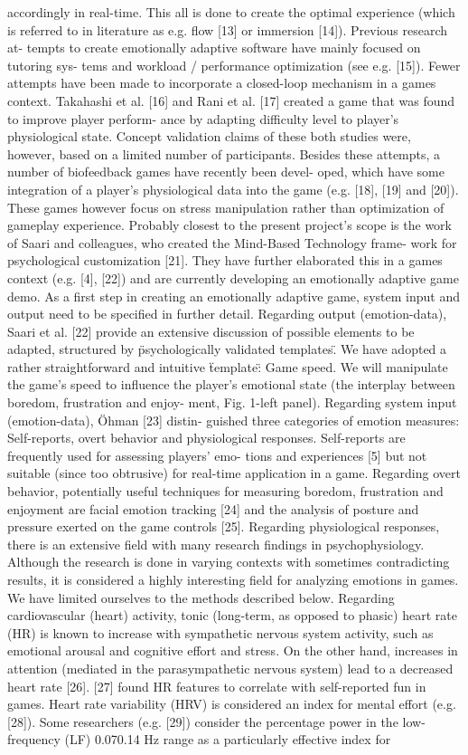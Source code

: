 accordingly in real-time. This all is done to create the optimal experience (which is referred to in literature as e.g. flow [13] or immersion [14]). Previous research at- tempts to create emotionally adaptive software have mainly focused on tutoring sys- tems and workload / performance optimization (see e.g. [15]). Fewer attempts have been made to incorporate a closed-loop mechanism in a games context. Takahashi et al. [16] and Rani et al. [17] created a game that was found to improve player perform- ance by adapting difficulty level to player's physiological state. Concept validation claims of these both studies were, however, based on a limited number of participants. Besides these attempts, a number of biofeedback games have recently been devel- oped, which have some integration of a player's physiological data into the game (e.g. [18], [19] and [20]). These games however focus on stress manipulation rather than optimization of gameplay experience. Probably closest to the present project's scope is the work of Saari and colleagues, who created the Mind-Based Technology frame- work for psychological customization [21]. They have further elaborated this in a games context (e.g. [4], [22]) and are currently developing an emotionally adaptive game demo. As a first step in creating an emotionally adaptive game, system input and output need to be specified in further detail. Regarding output (emotion-data), Saari et al. [22] provide an extensive discussion of possible elements to be adapted, structured by \"psychologically validated templates\". We have adopted a rather straightforward and intuitive \"template\": Game speed. We will manipulate the game's speed to influence the player's emotional state (the interplay between boredom, frustration and enjoy- ment, Fig. 1-left panel). Regarding system input (emotion-data), Öhman [23] distin- guished three categories of emotion measures: Self-reports, overt behavior and physiological responses. Self-reports are frequently used for assessing players' emo- tions and experiences [5] but not suitable (since too obtrusive) for real-time application in a game. Regarding overt behavior, potentially useful techniques for measuring boredom, frustration and enjoyment are facial emotion tracking [24] and the analysis of posture and pressure exerted on the game controls [25]. Regarding physiological responses, there is an extensive field with many research findings in psychophysiology. Although the research is done in varying contexts with sometimes contradicting results, it is considered a highly interesting field for analyzing emotions in games. We have limited ourselves to the methods described below. Regarding cardiovascular (heart) activity, tonic (long-term, as opposed to phasic) heart rate (HR) is known to increase with sympathetic nervous system activity, such as emotional arousal and cognitive effort and stress. On the other hand, increases in attention (mediated in the parasympathetic nervous system) lead to a decreased heart rate [26]. [27] found HR features to correlate with self-reported fun in games. Heart rate variability (HRV) is considered an index for mental effort (e.g. [28]). Some researchers (e.g. [29]) consider the percentage power in the low-frequency (LF) 0.070.14 Hz range as a particularly effective index for 